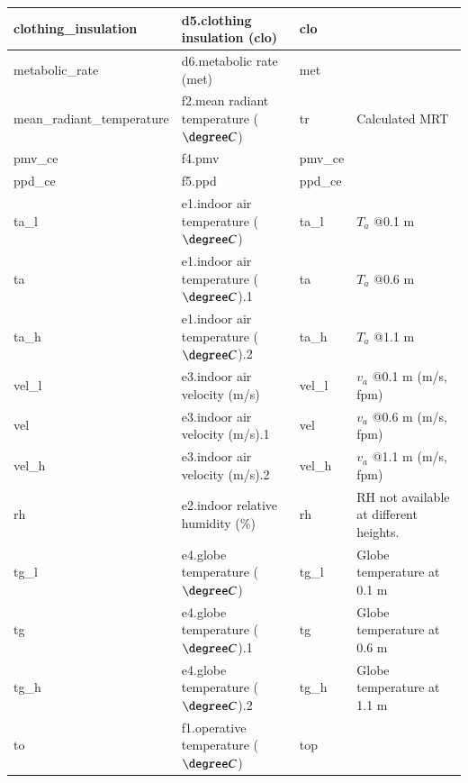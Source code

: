 \documentclass[1p]{elsarticle}
\begin{document}
\begin{table}[h!]
{\begin{tabular}{|l|l|l|l|}
      clothing\_insulation           & d5.clothing insulation (clo)   & clo                  & \\ \hline
      metabolic\_rate                & d6.metabolic rate (met)        & met                  & \\ \hline
      mean\_radiant\_temperature      & f2.mean radiant temperature ($\degree C$) & tr                 & Calculated MRT\\ \hline
      pmv\_ce                       & f4.pmv                         & pmv\_ce              & \\ \hline
      ppd\_ce                       & f5.ppd                         & ppd\_ce              & \\ \hline
      ta\_l                         & e1.indoor air temperature ($\degree C$)   & ta\_l                & $T_a$ @0.1 m \\ \hline
      ta                            & e1.indoor air temperature ($\degree C$).1 & ta                   & $T_a$ @0.6 m \\ \hline
      ta\_h                         & e1.indoor air temperature ($\degree C$).2 & ta\_h                & $T_a$ @1.1 m \\ \hline
      vel\_l                        & e3.indoor air velocity (m/s)    & vel\_l               & $v_a$ @0.1 m  (m/s, fpm) \\ \hline
      vel                           & e3.indoor air velocity (m/s).1  & vel                  & $v_a$ @0.6 m  (m/s, fpm) \\ \hline
      vel\_h                        & e3.indoor air velocity (m/s).2  & vel\_h               & $v_a$ @1.1 m  (m/s, fpm) \\ \hline
      rh                            & e2.indoor relative humidity (\%) & rh                 & RH not available at different heights.\\ \hline
      tg\_l                        & e4.globe temperature ($\degree C$)        & tg\_l               & Globe temperature at 0.1 m \\ \hline
      tg                           & e4.globe temperature ($\degree C$).1      & tg                  & Globe temperature at 0.6 m \\ \hline
      tg\_h                        & e4.globe temperature ($\degree C$).2      & tg\_h               & Globe temperature at 1.1 m \\ \hline
      to                           & f1.operative temperature ($\degree C$)    & top                 & \\ \hline

\end{tabular}}
\end{table}
\end{document}
